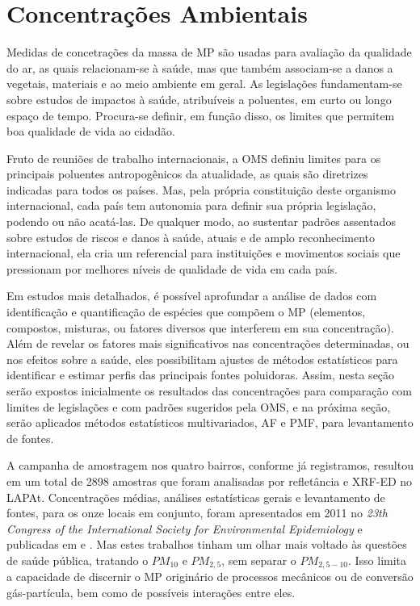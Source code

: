 \newpage
\section{Concentrações Ambientais}

Medidas de concetrações da massa de MP são usadas para avaliação da qualidade do
ar, as quais relacionam-se à saúde, mas que também associam-se a danos a 
vegetais, materiais e ao meio ambiente em geral. 
As legislações fundamentam-se sobre estudos de impactos à saúde, atribuíveis a 
poluentes, em curto ou longo espaço de tempo. Procura-se definir, em função 
disso, os limites que permitem boa qualidade de vida ao cidadão.

Fruto de reuniões de trabalho internacionais, a OMS \citeyearpar{who} definiu 
limites para os principais poluentes antropogênicos da atualidade, as quais são 
diretrizes indicadas para todos os países. Mas, pela própria constituição deste
organismo internacional, cada país tem autonomia para definir sua própria 
legislação, podendo ou não acatá-las. De qualquer modo, ao sustentar padrões 
assentados sobre estudos de riscos e danos à saúde, atuais e de amplo 
reconhecimento internacional, ela cria um referencial para instituições e 
movimentos sociais que pressionam por melhores níveis de qualidade de vida em 
cada país.

Em estudos mais detalhados, é possível aprofundar a análise de dados com 
identificação e quantificação de espécies que compõem o MP (elementos, compostos,
misturas, ou fatores diversos que interferem em sua concentração). 
Além de revelar os fatores mais significativos nas concentrações determinadas, 
ou nos efeitos sobre a saúde, eles possibilitam ajustes de métodos estatísticos 
para identificar e estimar perfis das principais fontes poluidoras. 
Assim, nesta seção serão expostos inicialmente os resultados das concentrações 
para comparação com limites de legislações e com padrões sugeridos pela OMS, 
e na próxima seção, serão aplicados métodos 
estatísticos multivariados, AF e PMF, para levantamento de fontes. 

A campanha de amostragem nos quatro bairros, conforme já registramos, resultou 
em um total de 2898 amostras que foram analisadas por refletância e XRF-ED no 
LAPAt. Concentrações médias, análises estatísticas gerais e levantamento de 
fontes, para os onze locais em conjunto, foram apresentados em 2011 no 
\textit{23th Congress of the International Society for Environmental 
Epidemiology} \citep{zhou2011} e publicadas em \citep{zhou2013} e 
\citep{zhou2014}. Mas estes trabalhos tinham um olhar mais voltado às questões 
de saúde pública, tratando o  $PM_{10}$ e $PM_{2,5}$, sem separar o 
$PM_{2,5-10}$. Isso limita a capacidade de discernir o MP originário de 
processos mecânicos ou de conversão gás-partícula, bem como de possíveis 
interações entre eles.

